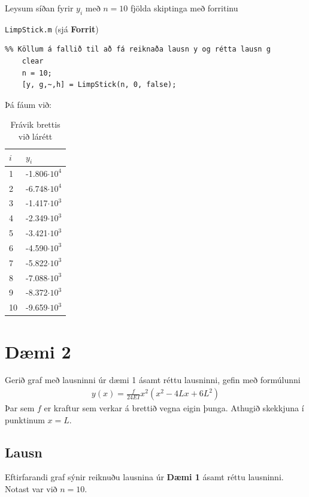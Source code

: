 \documentclass[11pt]{article}
\begin{document}
Leysum síðan fyrir $y_i$ með $n=10$ fjölda skiptinga með forritinu {\texttt{LimpStick.m} (sjá \textbf{Forrit})
\begin{verbatim}
%% Köllum á fallið til að fá reiknaða lausn y og rétta lausn g
    clear
    n = 10;
    [y, g,~,h] = LimpStick(n, 0, false);
\end{verbatim}
Þá fáum við:\\

\begin{table}[H]
\caption{Frávik brettis við lárétt}
\begin{center}
\begin{tabular}{l|l}
$i$		&  $y_i$	\\
\hline
1		&	-1.806$\cdot 10^4$		\\
2		&	-6.748$\cdot 10^4$		\\
3		&	-1.417$\cdot 10^3$		\\
4		&	-2.349$\cdot 10^3$		\\
5		&	-3.421$\cdot 10^3$		\\
6		&	-4.590$\cdot 10^3$		\\
7		&	-5.822$\cdot 10^3$		\\
8		&	-7.088$\cdot 10^3$		\\
9		&	-8.372$\cdot 10^3$		\\
10		&	-9.659$\cdot 10^3$		\\
\end{tabular}
\end{center}
\end{table}

\newpage
\section*{Dæmi 2}
Gerið graf með lausninni úr dæmi 1 ásamt réttu lausninni, gefin með formúlunni
\begin{align*}
	y(x)=\frac{f}{24EI}x^2(x^2-4Lx+6L^2)
\end{align*}
Þar sem $f$ er kraftur sem verkar á brettið vegna eigin þunga. Athugið skekkjuna í punktinum $x = L$.

\subsection*{Lausn}
Eftirfarandi graf sýnir reiknuðu lausnina úr \textbf{Dæmi 1} ásamt réttu lausninni. Notast var við $n=10$.

}
\end{document}
